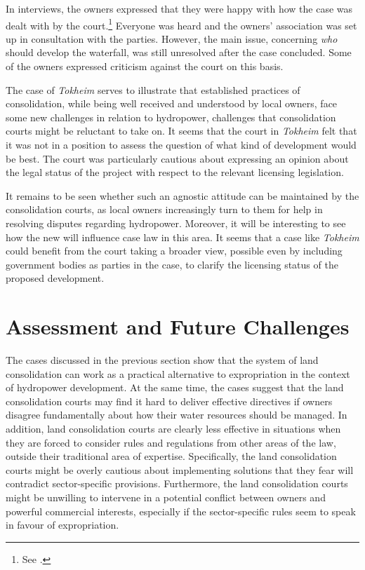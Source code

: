 In interviews, the owners expressed that they were happy with how the case was dealt with by the court.\footnote{See \cite[43-44]{stokstad11}.} Everyone was heard and the owners' association was set up in consultation with the parties. However, the main issue, concerning {\it who} should develop the waterfall, was still unresolved after the case concluded. Some of the owners expressed criticism against the court on this basis.

The case of \emph{Tokheim} serves to illustrate that established practices of consolidation, while being well received and understood by local owners, face some new challenges in relation to hydropower, challenges that consolidation courts might be reluctant to take on. It seems that the court in \emph{Tokheim} felt that it was not in a position to assess the question of what kind of development would be best. The court was particularly cautious about expressing an opinion about the legal status of the project with respect to the relevant licensing legislation. %

It remains to be seen whether such an agnostic attitude can be maintained by the consolidation courts, as local owners increasingly turn to them for help in resolving disputes regarding hydropower. Moreover, it will be interesting to see how the new \cite{lca13} will influence case law in this area. It seems that a case like \emph{Tokheim} could benefit from the court taking a broader view, possible even by including government bodies as parties in the case, to clarify the licensing status of the proposed development.

\section{Assessment and Future Challenges}\label{sec:6:5}

The cases discussed in the previous section show that the system of land consolidation can work as a practical alternative to expropriation in the context of hydropower development. At the same time, the cases suggest that the land consolidation courts may find it hard to deliver effective directives if owners disagree fundamentally about how their water resources should be managed. In addition, land consolidation courts are clearly less effective in situations when they are forced to consider rules and regulations from other areas of the law, outside their traditional area of expertise. Specifically, the land consolidation courts might be overly cautious about implementing solutions that they fear will contradict sector-specific provisions. Furthermore, the land consolidation courts might be unwilling to intervene in a potential conflict between owners and powerful commercial interests, especially if the sector-specific rules seem to speak in favour of expropriation.

